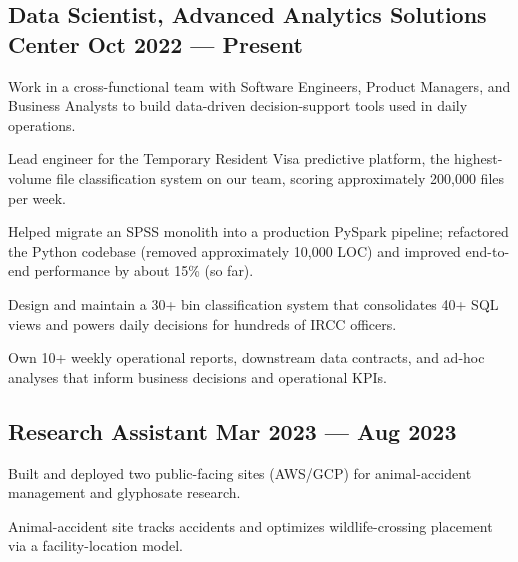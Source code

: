 \subsection{{Data Scientist, Advanced Analytics Solutions Center \hfill Oct 2022 --- Present}}
\begin{zitemize}
    \setlength\itemsep{0.4em}
    \item Work in a cross-functional team with Software Engineers, Product Managers, and Business Analysts to build data-driven decision-support tools used in daily operations.
    \item Lead engineer for the Temporary Resident Visa predictive platform, the highest-volume file classification system on our team, scoring approximately 200{,}000 files per week.
    \item Helped migrate an SPSS monolith into a production PySpark pipeline; refactored the Python codebase (removed approximately 10{,}000 LOC) and improved end-to-end performance by about 15\% (so far).
    \item Design and maintain a 30+ bin classification system that consolidates 40+ SQL views and powers daily decisions for hundreds of IRCC officers.
    \item Own 10+ weekly operational reports, downstream data contracts, and ad-hoc analyses that inform business decisions and operational KPIs.
\end{zitemize}
\vspace{0.75em}

\subsection{{Research Assistant \hfill Mar 2023 --- Aug 2023}}
\begin{zitemize}
    \setlength\itemsep{0.4em}
    \item Built and deployed two public-facing sites (AWS/GCP) for animal-accident management and glyphosate research.
    \item Animal-accident site tracks accidents and optimizes wildlife-crossing placement via a facility-location model.
\end{zitemize}
\vspace{0.75em}

